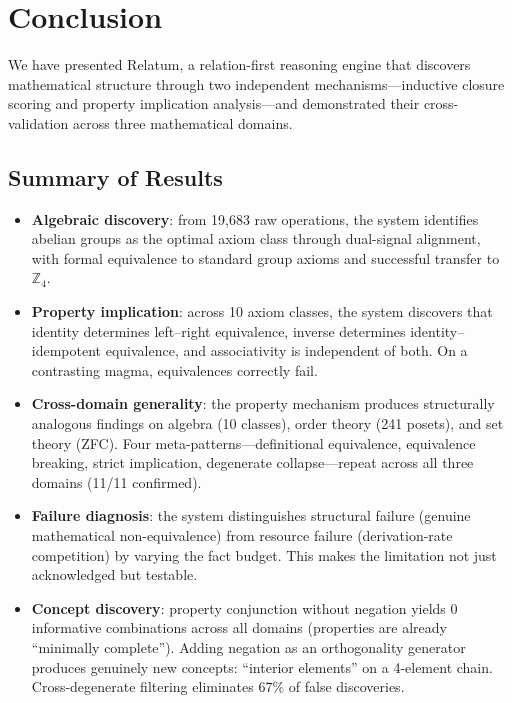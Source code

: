 \section{Conclusion}
\label{sec:conclusion}

We have presented Relatum, a relation-first reasoning engine that discovers mathematical structure through two independent mechanisms---inductive closure scoring and property implication analysis---and demonstrated their cross-validation across three mathematical domains.

\subsection{Summary of Results}

\begin{itemize}
\item \textbf{Algebraic discovery}: from 19{,}683 raw operations, the system identifies abelian groups as the optimal axiom class through dual-signal alignment, with formal equivalence to standard group axioms and successful transfer to $\mathbb{Z}_4$.

\item \textbf{Property implication}: across 10 axiom classes, the system discovers that identity determines left--right equivalence, inverse determines identity--idempotent equivalence, and associativity is independent of both. On a contrasting magma, equivalences correctly fail.

\item \textbf{Cross-domain generality}: the property mechanism produces structurally analogous findings on algebra (10 classes), order theory (241 posets), and set theory (ZFC). Four meta-patterns---definitional equivalence, equivalence breaking, strict implication, degenerate collapse---repeat across all three domains (11/11 confirmed).

\item \textbf{Failure diagnosis}: the system distinguishes structural failure (genuine mathematical non-equivalence) from resource failure (derivation-rate competition) by varying the fact budget. This makes the limitation not just acknowledged but testable.

\item \textbf{Concept discovery}: property conjunction without negation yields 0 informative combinations across all domains (properties are already ``minimally complete''). Adding negation as an orthogonality generator produces genuinely new concepts: ``interior elements'' on a 4-element chain. Cross-degenerate filtering eliminates 67\% of false discoveries.
\end{itemize}

